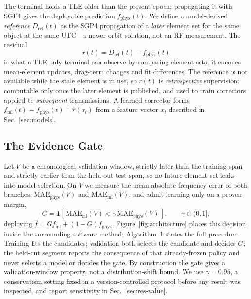 \documentclass[conference]{IEEEtran}
\begin{document}
The terminal holds a TLE older than the present epoch; propagating it with SGP4
gives the deployable prediction $f_{\mathrm{phys}}(t)$. We define a
model-derived \emph{reference} $D_{\mathrm{ref}}(t)$ as the SGP4 propagation of
a \emph{later} element set for the same object at the same UTC---a newer orbit
solution, not an RF measurement. The residual
\begin{equation}
r(t) = D_{\mathrm{ref}}(t) - f_{\mathrm{phys}}(t)
\label{eq:residual}
\end{equation}
is what a TLE-only terminal can observe by comparing element sets; it encodes
mean-element updates, drag-term changes and fit differences. The reference is not
available while the stale element is in use, so $r(t)$ is \emph{retrospective}
supervision: computable only once the later element is published, and used to
train correctors applied to \emph{subsequent} transmissions. A learned corrector
forms $f_{\mathrm{ml}}(t)=f_{\mathrm{phys}}(t)+\hat r(x_t)$ from a feature
vector $x_t$ described in Sec.~\ref{sec:models}.

\subsection{The Evidence Gate}
\label{sec:gate}
Let $V$ be a chronological validation window, strictly later than the training
span and strictly earlier than the held-out test span, so no future element set
leaks into model selection. On $V$ we measure the mean absolute frequency error
of both branches, $\mathrm{MAE}_{\mathrm{phys}}(V)$ and
$\mathrm{MAE}_{\mathrm{ml}}(V)$, and admit learning only on a proven margin,
\begin{equation}
G = \mathbf{1}\!\left[\,\mathrm{MAE}_{\mathrm{ml}}(V) < \gamma\,
\mathrm{MAE}_{\mathrm{phys}}(V)\,\right],\qquad \gamma\in(0,1],
\label{eq:gate}
\end{equation}
deploying $\hat f = G f_{\mathrm{ml}} + (1-G) f_{\mathrm{phys}}$.
Figure~\ref{fig:architecture} places this decision inside the surrounding
software method; Algorithm~1 states the full procedure. Training fits the candidates; validation both selects
the candidate and decides $G$; the held-out segment reports the consequence of
that already-frozen policy and never selects a model or decides the gate. By
construction the gate gives a validation-window property, not a
distribution-shift bound. We use $\gamma=0.95$, a conservatism setting fixed in
a version-controlled protocol before any result was inspected, and report
sensitivity in Sec.~\ref{sec:res-value}.
\end{document}
